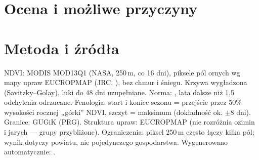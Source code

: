 \documentclass[10pt,a4paper,twocolumn]{article}
\begin{document}
\section{Ocena i możliwe przyczyny}

\section*{Metoda i źródła}
{\footnotesize
NDVI: MODIS MOD13Q1 (NASA, 250\,m, co 16 dni), piksele pól ornych wg mapy upraw EUCROPMAP (JRC, ), bez chmur i śniegu.
Krzywa wygładzona (Savitzky--Golay), luki do 48 dni uzupełniane. Norma: , lata dalsze niż 1,5 odchylenia odrzucane.
Fenologia: start i koniec sezonu = przejście przez 50\% wysokości rocznej „górki” NDVI, szczyt = maksimum (dokładność ok. $\pm$8 dni).
Granice: GUGiK (PRG). Struktura upraw: EUCROPMAP (nie rozróżnia ozimin i jarych — grupy przybliżone).
Ograniczenia: piksel 250\,m często łączy kilka pól; wynik dotyczy powiatu, nie pojedynczego gospodarstwa.
Wygenerowano automatycznie: .\par}
\end{document}
